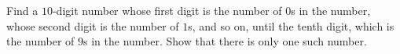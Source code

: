Find a $10$-digit number whose first digit is the number of $0$s in the number, whose second digit is the number of $1$s, and so on, until the tenth digit, which is the number of $9$s in the number. Show that there is only one such number.

